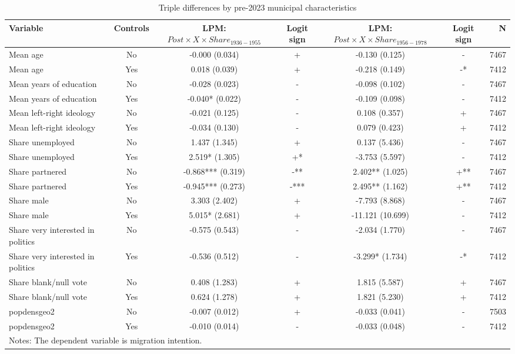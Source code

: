 \begin{table}[!htbp]
\centering
\caption{Triple differences by pre-2023 municipal characteristics}
\label{tab:triple_differences_combined_key}
\small
\begin{tabular}{lcccccr}
\hline
Variable & Controls & LPM: $Post \times X \times Share_{1936-1955}$ & Logit sign & LPM: $Post \times X \times Share_{1956-1978}$ & Logit sign & N \\
\hline
Mean age & No & -0.000 (0.034) & + & -0.130 (0.125) & - & 7467 \\
Mean age & Yes & 0.018 (0.039) & + & -0.218 (0.149) & -* & 7412 \\
Mean years of education & No & -0.028 (0.023) & - & -0.098 (0.102) & - & 7467 \\
Mean years of education & Yes & -0.040* (0.022) & - & -0.109 (0.098) & - & 7412 \\
Mean left-right ideology & No & -0.021 (0.125) & - & 0.108 (0.357) & + & 7467 \\
Mean left-right ideology & Yes & -0.034 (0.130) & - & 0.079 (0.423) & + & 7412 \\
Share unemployed & No & 1.437 (1.345) & + & 0.137 (5.436) & - & 7467 \\
Share unemployed & Yes & 2.519* (1.305) & +* & -3.753 (5.597) & - & 7412 \\
Share partnered & No & -0.868*** (0.319) & -** & 2.402** (1.025) & +** & 7467 \\
Share partnered & Yes & -0.945*** (0.273) & -*** & 2.495** (1.162) & +** & 7412 \\
Share male & No & 3.303 (2.402) & + & -7.793 (8.868) & - & 7467 \\
Share male & Yes & 5.015* (2.681) & + & -11.121 (10.699) & - & 7412 \\
Share very interested in politics & No & -0.575 (0.543) & - & -2.034 (1.770) & - & 7467 \\
Share very interested in politics & Yes & -0.536 (0.512) & - & -3.299* (1.734) & -* & 7412 \\
Share blank/null vote & No & 0.408 (1.283) & + & 1.815 (5.587) & + & 7467 \\
Share blank/null vote & Yes & 0.624 (1.278) & + & 1.821 (5.230) & + & 7412 \\
popdensgeo2 & No & -0.007 (0.012) & + & -0.033 (0.041) & - & 7503 \\
popdensgeo2 & Yes & -0.010 (0.014) & - & -0.033 (0.048) & - & 7412 \\
\hline
\multicolumn{7}{l}{\footnotesize Notes: The dependent variable is migration intention.} \\

\end{tabular}
\end{table}
